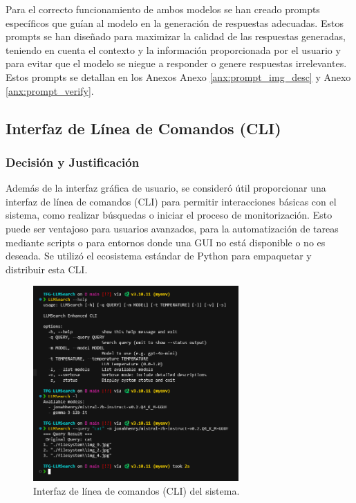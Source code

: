 Para el correcto funcionamiento de ambos modelos se han creado prompts específicos que guían al modelo en la generación de respuestas adecuadas. Estos prompts se han diseñado para maximizar la calidad de las respuestas generadas, teniendo en cuenta el contexto y la información proporcionada por el usuario y para evitar que el modelo se niegue a responder o genere respuestas irrelevantes.
Estos prompts se detallan en los Anexos Anexo \ref{anx:prompt_img_desc} y Anexo \ref{anx:prompt_verify}.

\subsection{Interfaz de Línea de Comandos (CLI)}
\label{subsec:decision_terminal}
\subsubsection{Decisión y Justificación}
Además de la interfaz gráfica de usuario, se consideró útil proporcionar una interfaz de línea de comandos (CLI) para permitir interacciones básicas con el sistema, como realizar búsquedas o iniciar el proceso de monitorización. Esto puede ser ventajoso para usuarios avanzados, para la automatización de tareas mediante scripts o para entornos donde una GUI no está disponible o no es deseada. Se utilizó el ecosistema estándar de Python para empaquetar y distribuir esta CLI.

\begin{figure}[!htbp]
    \centering
    \includegraphics[width=0.7\textwidth]{archivos/terminal_example.png}
    \caption{Interfaz de línea de comandos (CLI) del sistema.}
    \label{fig:terminal}
\end{figure}

